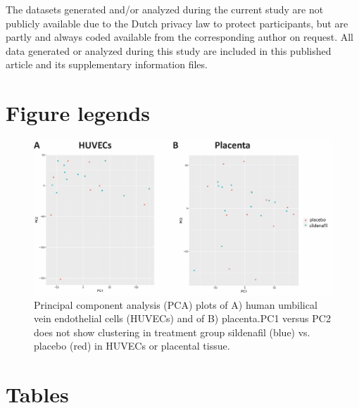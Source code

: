 \documentclass[authordate, empirical]{jote-new-article}
\begin{document}
	The datasets generated and/or analyzed during the current study are not publicly available due to the Dutch privacy law to protect participants, but are partly and always coded available from the corresponding author on request. All data generated or analyzed during this study are included in this published article and its supplementary information files.



\printbibliography







\clearpage
\onecolumn
	\section{Figure legends}







	



	\begin{figure}[h!]
		\includegraphics[width=\linewidth]{media/image1.jpeg}

		\caption{Principal component analysis (PCA) plots of A) human umbilical vein endothelial cells (HUVECs) and of B) placenta.PC1 versus PC2 does not show clustering in treatment group sildenafil (blue) vs. placebo (red) in HUVECs or placental tissue.}

		\label{fig:rId8}
        

	\end{figure}





\newpage

	\section{Tables}
\end{document}
